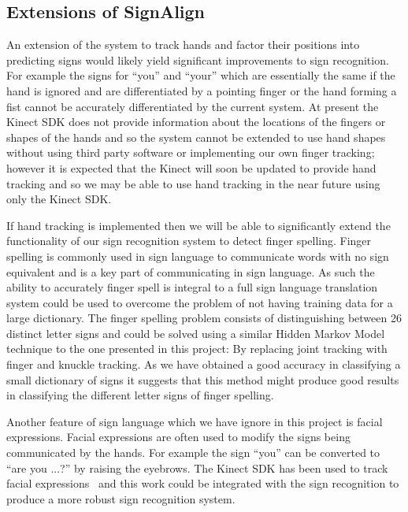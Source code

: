 \subsection{Extensions of SignAlign}
An extension of the system to track hands and factor their positions into predicting signs would likely yield significant improvements to sign recognition. For example the signs for ``you'' and ``your'' which are essentially the same if the hand is ignored and are differentiated by a pointing finger or the hand forming a fist cannot be accurately differentiated by the current system. At present the Kinect SDK does not provide information about the locations of the fingers or shapes of the hands and so the system cannot be extended to use hand shapes without using third party software or implementing our own finger tracking; however it is expected that the Kinect will soon be updated to provide hand tracking and so we may be able to use hand tracking in the near future using only the Kinect SDK.

If hand tracking is implemented then we will be able to significantly extend the functionality of our sign recognition system to detect finger spelling. Finger spelling is commonly used in sign language to communicate words with no sign equivalent and is a key part of communicating in sign language. As such the ability to accurately finger spell is integral to a full sign language translation system could be used to overcome the problem of not having training data for a large dictionary. The finger spelling problem consists of distinguishing between 26 distinct letter signs and could be solved using a similar Hidden Markov Model technique to the one presented in this project: By replacing joint tracking with finger and knuckle tracking. As we have obtained a good accuracy in classifying a small dictionary of signs it suggests that this method might produce good results in classifying the different letter signs of finger spelling.

Another feature of sign language which we have ignore in this project is facial expressions. Facial expressions are often used to modify the signs being communicated by the hands. For example the sign ``you'' can be converted to ``are you ...?'' by raising the eyebrows. The Kinect SDK has been used to track facial expressions~\citep{Microsoft:2013:Face} and this work could be integrated with the sign recognition to produce a more robust sign recognition system.





